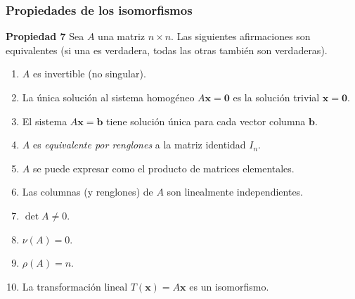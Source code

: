 {\nologo 
\begin{frame}\frametitle{Propiedades de los isomorfismos}
	
	\begin{prop}{\textbf{Propiedad 7}}
		\justifying
		Sea $A$ una matriz $n\times n$. Las siguientes afirmaciones son equivalentes (si una es verdadera, todas
		las otras también son verdaderas). 
		\begin{enumerate}[$a$]\justifying 
			\item $A$ es invertible (no singular).
			\item La única solución al sistema homogéneo $A\mathbf{x} = \mathbf{0}$ es la solución 
			trivial $\mathbf{x}=\mathbf{0}$.
			\item  El sistema $A\mathbf{x} = \mathbf{b}$ tiene solución única para cada vector columna
			$\mathbf{b}$.
			\item $A$ es \textit{equivalente por renglones} a la matriz identidad $I_n$.
			\item $A$ se puede expresar como el producto de matrices elementales.
			\item Las columnas (y renglones) de $A$ son linealmente independientes.
			\item $\det A\neq 0$.
			\item $\nu(A)=0$.
			\item $\rho(A)=n$.
			\item La transformación lineal $T(\mathbf{x})=A\mathbf{x}$ es un isomorfismo.
		\end{enumerate}
	\end{prop}	
	
\end{frame}
}


\subsection{}

